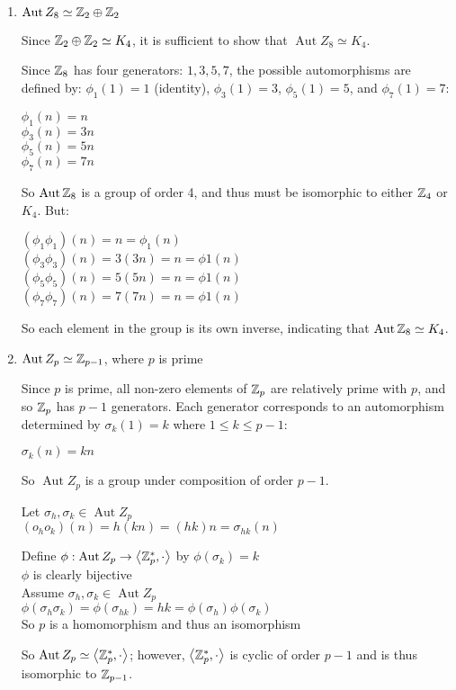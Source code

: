 \documentclass[letterpaper,12pt,fleqn]{article}
\newcommand{\p}{\phi}
\newcommand{\bas}[2]{\left<#1,#2\right>}
\newcommand{\aut}[1]{\operatorname{Aut}{#1}}
\renewcommand{\o}{\sigma}
\newcommand{\iso}{\simeq}
\newcommand{\zstar}[2]{\bas{\Z_{#1}^*}{#2}}
\begin{document}
\begin{enumerate}[label=\alph*)]
\begin{enumerate}[label=\arabic*)]
    \bigskip

  \item $\aut{Z_8}\iso\Z_2\oplus\Z_2$

    Since $\Z_2\oplus\Z_2\iso K_4$, it is sufficient to show that
    $\aut{Z_8}\iso K_4$.

    Since $\mathbb{Z}_8$ has four generators: $1,3,5,7$, the possible automorphisms are
    defined by: $\p_1(1)=1$ (identity), $\p_3(1)=3$, $\p_5(1)=5$, and
    $\p_7(1)=7$:
    
    $\p_1(n)=n$ \\
    $\p_3(n)=3n$ \\
    $\p_5(n)=5n$ \\
    $\p_7(n)=7n$

    So $\aut{\Z_8}$ is a group of order 4, and thus must be isomorphic to
    either $\mathbb{Z}_4$ or $K_4$. But:
    
    $(\p_1\p_1)(n)=n=\p_1(n)$ \\
    $(\p_3\p_3)(n)=3(3n)=n=\p1(n)$ \\
    $(\p_5\p_5)(n)=5(5n)=n=\p1(n)$ \\
    $(\p_7\p_7)(n)=7(7n)=n=\p1(n)$

    So each element in the group is its own inverse, indicating that
    $\aut{\Z_8}\iso K_4$.

    \bigskip

  \item $\aut{Z_p}\iso\Z_{p-1}$, where $p$ is prime

    Since $p$ is prime, all non-zero elements of $\mathbb{Z}_p$ are relatively prime
    with $p$, and so $\mathbb{Z}_p$ has $p-1$ generators. Each generator corresponds
    to an automorphism determined by $\o_k(1)=k$ where $1\le k\le p-1$:

    $\o_k(n)=kn$

    So $\aut{Z_p}$ is a group under composition of order $p-1$.

    Let $\o_h,\o_k\in\aut{Z_p}$ \\
    $(o_ho_k)(n)=h(kn)=(hk)n=\o_{hk}(n)$

    Define $\p:\aut{Z_p}\to\zstar{p}{\cdot}$ by $\p(\o_k)=k$ \\
    $\p$ is clearly bijective \\
    Assume $\o_h,\o_k\in\aut{Z_p}$ \\
    $\p(\o_h\o_k)=\p(\o_{hk})=hk=\p(\o_h)\p(\o_k)$ \\
    So $p$ is a homomorphism and thus an isomorphism

    So $\aut{Z_p}\iso\zstar{p}{\cdot}$; however, $\zstar{p}{\cdot}$ is cyclic
    of order $p-1$ and is thus isomorphic to $\mathbb{Z}_{p-1}$.


\end{enumerate}
\end{enumerate}
\end{document}
